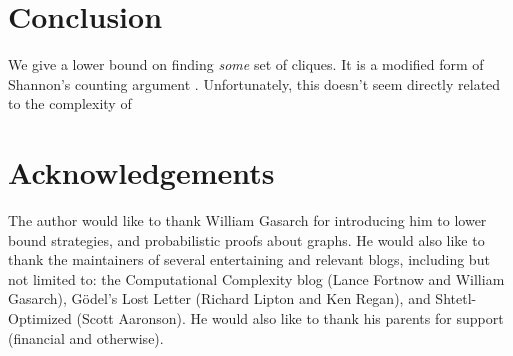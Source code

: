 \documentclass[12pt]{article}
\theoremstyle{definition}
\begin{document}
\section{Conclusion}

We give a lower bound on finding {\em some} set of cliques.
It is a modified form of Shannon's counting argument
\cite{shannon_synthesis_1949}. Unfortunately,
this doesn't seem directly related to the
complexity of 

\section{Acknowledgements}

The author would like to thank William Gasarch for introducing him
to lower bound strategies, and probabilistic proofs about graphs.
He would also like to thank the maintainers of
several entertaining and relevant blogs, including but
not limited to: the Computational Complexity blog
(Lance Fortnow and William Gasarch), 
G\"odel's Lost Letter (Richard Lipton and Ken Regan),
and Shtetl-Optimized (Scott Aaronson). 
He would also like to thank
his parents for support (financial and otherwise).



\end{document}

